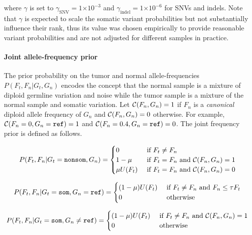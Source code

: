 \documentclass{article}
\newcommand{\e}[1]{\ensuremath{\times 10^{#1}}}
\begin{document}
\noindent where $\gamma$ is set to $\gamma_{\text{SNV}} = 1\e{-3}$ and $\gamma_{\text{indel}} = 1\e{-6}$ for SNVs and indels. Note that $\gamma$ is expected to scale the somatic variant probabilities but not substantially influence their rank, thus its value was chosen empirically to provide reasonable variant probabilities and are not adjusted for different samples in practice.


\paragraph{Joint allele-frequency prior}
The prior probability on the tumor and normal allele-frequencies $P(F_t, F_n|G_t, G_n)$ encodes the concept that the normal sample is a mixture of diploid germline variation and noise while the tumor sample is a mixture of the normal sample and somatic variation. Let ${\cal C} (F_n, G_n) = 1$ if $F_n$ is a {\em canonical} diploid allele frequency of $G_n$ and ${\cal C} (F_n, G_n) = 0$ otherwise. For example, ${\cal C} (F_n=0, G_n = {\tt ref}) = 1$ and ${\cal C} (F_n=0.4, G_n = {\tt ref}) = 0$. The joint frequency prior is defined as follows.

\begin{equation*}
P(F_t, F_n | G_t = {\tt nonsom}, G_n)=
\begin{cases}
	0 & \text{ if } F_t \neq F_n \\
	1-\mu & \text{ if } F_t = F_n \text{ and }{\cal C}(F_n, G_n) = 1 \\
	\mu U(F_t) & \text{ if } F_t = F_n \text{ and }{\cal C}(F_n, G_n) = 0 \\
\end{cases}
\end{equation*}

\begin{equation*}
P(F_t, F_n | G_t = {\tt som}, G_n = {\tt ref})=
\begin{cases}
	(1-\mu)U(F_t) & \text{ if } F_t \neq F_n \text{ and } F_n \leq \tau F_t \\
	0 & \text{ otherwise } \\
\end{cases}
\end{equation*}

\begin{equation*}
P(F_t, F_n | G_t = {\tt som}, G_n \neq {\tt ref})=
\begin{cases}
	(1-\mu)U(F_t) & \text{ if } F_t \neq F_n \text{ and } {\cal C}(F_n, G_n) = 1\\
	0 & \text{ otherwise } \\
\end{cases}
\end{equation*}
\end{document}
